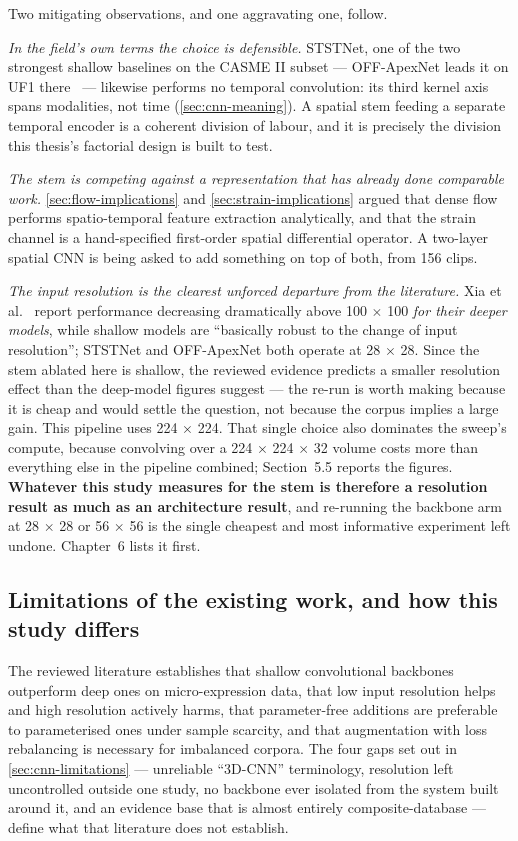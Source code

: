 Two mitigating observations, and one aggravating one, follow.

\textit{In the field's own terms the choice is defensible.} STSTNet, one of the two strongest shallow baselines on the CASME II subset --- OFF-ApexNet leads it on UF1 there~\cite{liong2019b} --- likewise performs no temporal convolution: its third kernel axis spans modalities, not time (\autoref{sec:cnn-meaning}). A spatial stem feeding a separate temporal encoder is a coherent division of labour, and it is precisely the division this thesis's factorial design is built to test.

\textit{The stem is competing against a representation that has already done comparable work.} \autoref{sec:flow-implications} and \autoref{sec:strain-implications} argued that dense flow performs spatio-temporal feature extraction analytically, and that the strain channel is a hand-specified first-order spatial differential operator. A two-layer spatial CNN is being asked to add something on top of both, from 156 clips.

\textit{The input resolution is the clearest unforced departure from the literature.} Xia et al.~\cite{xia2020b} report performance decreasing dramatically above 100 $\times$ 100 \textit{for their deeper models}, while shallow models are ``basically robust to the change of input resolution''; STSTNet and OFF-ApexNet both operate at 28 $\times$ 28. Since the stem ablated here is shallow, the reviewed evidence predicts a smaller resolution effect than the deep-model figures suggest --- the re-run is worth making because it is cheap and would settle the question, not because the corpus implies a large gain. This pipeline uses 224 $\times$ 224. That single choice also dominates the sweep's compute, because convolving over a 224 $\times$ 224 $\times$ 32 volume costs more than everything else in the pipeline combined; Section~5.5 reports the figures. \textbf{Whatever this study measures for the stem is therefore a resolution result as much as an architecture result}, and re-running the backbone arm at 28 $\times$ 28 or 56 $\times$ 56 is the single cheapest and most informative experiment left undone. Chapter~6 lists it first.

\subsection{Limitations of the existing work, and how this study differs}
\label{sec:cnn-gap}

The reviewed literature establishes that shallow convolutional backbones outperform deep ones on micro-expression data, that low input resolution helps and high resolution actively harms, that parameter-free additions are preferable to parameterised ones under sample scarcity, and that augmentation with loss rebalancing is necessary for imbalanced corpora. The four gaps set out in \autoref{sec:cnn-limitations} --- unreliable ``3D-CNN'' terminology, resolution left uncontrolled outside one study, no backbone ever isolated from the system built around it, and an evidence base that is almost entirely composite-database --- define what that literature does not establish.

